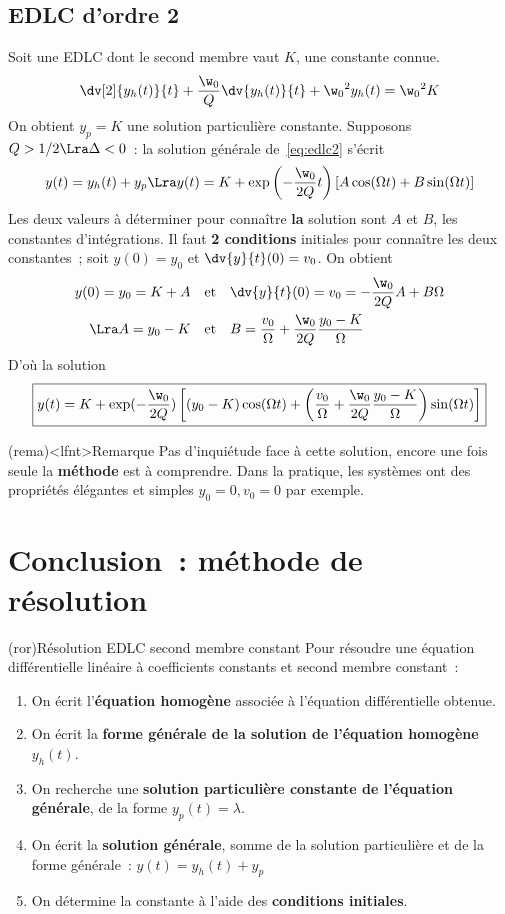 \documentclass[a4paper, 12pt, garamond]{book}
\begin{document}
\subsection{EDLC d'ordre 2}
Soit une EDLC dont le second membre vaut $K$, une constante connue.
\begin{equation}
	\dv[2]{y_h(t)}{t} + \frac{\w_0}{Q}\dv{y_h(t)}{t} + \w_0{}^{2} y_h(t) =
	\w_0{}^{2}K
	\label{eq:edlc2}
\end{equation}
On obtient $y_p = K$ une solution particulière constante. Supposons $Q>1/2 \Lra
	\Delta<0$~: la solution générale de~\eqref{eq:edlc2} s'écrit
\[
	y(t) = y_h(t) + y_p
	\Lra
	y(t) = K + \exp\left( -\frac{\w_0}{2Q}t \right)
	\left[A\cos(\Omega t) + B\sin(\Omega t)\right]
\]
Les deux valeurs à déterminer pour connaître \textbf{la} solution sont $A$ et
$B$, les constantes d'intégrations. Il faut \textbf{2 conditions} initiales pour
connaître les deux constantes~; soit $y(0) = y_0$ et $\dv{y}{t}\/(0) = v_0$. On
obtient
\begin{align*}
	y(0) = y_0 = K + A
	\quad & \text{et} \quad
	\dv{y}{t}\/(0) = v_0 = -\frac{\w_0}{2Q}A + B\Omega
	\\\Lra
	A = y_0 - K
	\quad & \text{et} \quad
	B = \frac{v_0}{\Omega} + \frac{\w_0}{2Q}\frac{y_0-K}{\Omega}
\end{align*}
D'où la solution
\[
	\boxed{
		y(t) = K + \exp(-\frac{\w_0}{2Q})
		\left[
			(y_0-K)\cos(\Omega t) +
			\left( \frac{v_0}{\Omega} + \frac{\w_0}{2Q}\frac{y_0-K}{\Omega} \right)
			\sin(\Omega t)
			\right]
	}
\]
\begin{tcb}(rema)<lfnt>{Remarque}
	Pas d'inquiétude face à cette solution, encore une fois seule la
	\textbf{méthode} est à comprendre. Dans la pratique, les systèmes ont des
	propriétés élégantes et simples $y_0 = 0, v_0 = 0$ par exemple.
\end{tcb}

\section{Conclusion~: méthode de résolution}
\begin{tcb}(ror){Résolution EDLC second membre constant}
	Pour résoudre une équation différentielle linéaire à
	coefficients constants et second membre constant~:
	\begin{enumerate}[label=\sqenumi]
		\item On écrit l'\textbf{équation homogène} associée à
		      l'équation différentielle obtenue.
		\item On écrit la \textbf{forme générale de la solution de
			      l'équation homogène} $y_h(t)$.
		\item On recherche une \textbf{solution particulière constante de l'équation
			      générale}, de la forme $y_p(t) = \lambda$.
		\item On écrit la \textbf{solution générale}, somme de la
		      solution particulière et de la forme générale~: $y(t) = y_h(t) + y_p$
		\item On détermine la constante à l'aide des \textbf{conditions initiales}.
	\end{enumerate}
\end{tcb}
\end{document}
